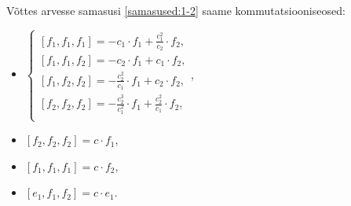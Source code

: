 Võttes arvesse samasusi \eqref{samasused:1-2} saame kommutatsiooniseosed:
\begin{itemize}
    \item $\begin{cases}
            \left[ f_1, f_1, f_1 \right] = -c_1 \cdot f_1 + \frac{c_1^2}{c_2} \cdot f_2, \\[0.2cm]
            \left[ f_1, f_1, f_2 \right] = -c_2 \cdot f_1 + c_1 \cdot f_2, \\[0.2cm]
            \left[ f_1, f_2, f_2 \right] = -\frac{c_2^2}{c_1} \cdot f_1 + c_2 \cdot f_2, \\[0.3cm]
            \left[ f_2, f_2, f_2 \right] = -\frac{c_2^3}{c_1^2} \cdot f_1 + \frac{c_2^2}{c_1} \cdot f_2, \\[0.2cm]
        \end{cases}$,
    \item $\left[ f_2, f_2, f_2 \right] = c \cdot f_1$,
    \item $\left[ f_1, f_1, f_1 \right] = c \cdot f_2$,
    \item $\left[ e_1, f_1, f_2 \right] = c \cdot e_1$.
\end{itemize}
